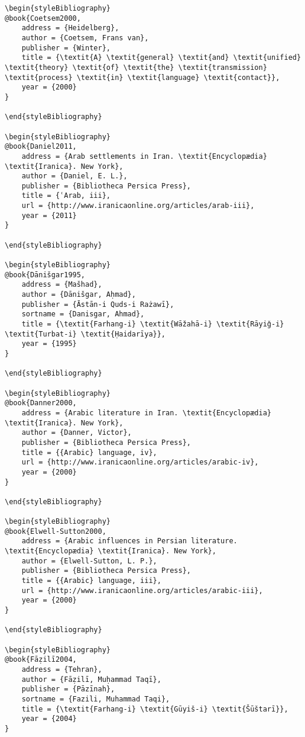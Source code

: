 \documentclass[output=paper]{langsci/langscibook}
\begin{document}
\begin{verbatim}
\begin{styleBibliography}
@book{Coetsem2000,
	address = {Heidelberg},
	author = {Coetsem, Frans van},
	publisher = {Winter},
	title = {\textit{A} \textit{general} \textit{and} \textit{unified} \textit{theory} \textit{of} \textit{the} \textit{transmission} \textit{process} \textit{in} \textit{language} \textit{contact}},
	year = {2000}
}

\end{styleBibliography}

\begin{styleBibliography}
@book{Daniel2011,
	address = {Arab settlements in Iran. \textit{Encyclopædia} \textit{Iranica}. New York},
	author = {Daniel, E. L.},
	publisher = {Bibliotheca Persica Press},
	title = {ʿArab, iii},
	url = {http://www.iranicaonline.org/articles/arab-iii},
	year = {2011}
}

\end{styleBibliography}

\begin{styleBibliography}
@book{Dānišgar1995,
	address = {Mašhad},
	author = {Dānišgar, Aḥmad},
	publisher = {Āstān-i Quds-i Rażawī},
	sortname = {Danisgar, Ahmad},
	title = {\textit{Farhang-i} \textit{Wāžahā-i} \textit{Rāyiǧ-i} \textit{Turbat-i} \textit{Ḥaidarīya}},
	year = {1995}
}

\end{styleBibliography}

\begin{styleBibliography}
@book{Danner2000,
	address = {Arabic literature in Iran. \textit{Encyclopædia} \textit{Iranica}. New York},
	author = {Danner, Victor},
	publisher = {Bibliotheca Persica Press},
	title = {{Arabic} language, iv},
	url = {http://www.iranicaonline.org/articles/arabic-iv},
	year = {2000}
}

\end{styleBibliography}

\begin{styleBibliography}
@book{Elwell-Sutton2000,
	address = {Arabic influences in Persian literature. \textit{Encyclopædia} \textit{Iranica}. New York},
	author = {Elwell-Sutton, L. P.},
	publisher = {Bibliotheca Persica Press},
	title = {{Arabic} language, iii},
	url = {http://www.iranicaonline.org/articles/arabic-iii},
	year = {2000}
}

\end{styleBibliography}

\begin{styleBibliography}
@book{Fāẓilī2004,
	address = {Tehran},
	author = {Fāẓilī, Muḥammad Taqī},
	publisher = {Pāzīnah},
	sortname = {Fazili, Muhammad Taqi},
	title = {\textit{Farhang-i} \textit{Gūyiš-i} \textit{Šūštarī}},
	year = {2004}
}


\end{verbatim}
\end{document}
